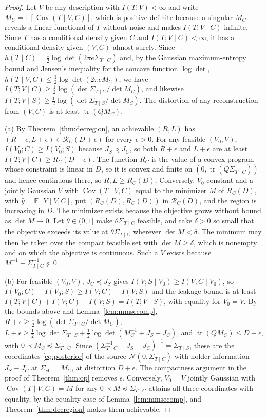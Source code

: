 \documentclass[11pt,onecolumn]{IEEEtran}
\newcommand{\E}{\mathbb{E}}
\newcommand{\tr}{\operatorname{tr}}
\newcommand{\Cov}{\operatorname{Cov}}
\newcommand{\Sez}{\Sigma_{e0}}
\newcommand{\Kc}{\Sigma_{T\mid S}}
\begin{document}
\begin{proof}
Let $V$ be any description with $I(T;V)<\infty$ and write
$M_C=\E[\Cov(T\mid V,C)]$, which is positive definite because a singular
$M_C$ reveals a linear functional of $T$ without noise and makes
$I(T;V\mid C)$ infinite. Since $T$ has a conditional density given $C$
and $I(T;V\mid C)<\infty$, it has a conditional density given $(V,C)$
almost surely. Since $h(T\mid C)=\tfrac12\log\det(2\pi e\Sigma_{T\mid C})$
and, by the Gaussian maximum-entropy bound and Jensen's inequality for
the concave function $\log\det$, $h(T\mid V,C)\le\tfrac12\log\det(2\pi eM_C)$, we have
$I(T;V\mid C)\ge\tfrac12\log(\det\Sigma_{T\mid C}/\det M_C)$, and likewise
$I(T;V\mid S)\ge\tfrac12\log(\det\Sigma_{T\mid S}/\det M_S)$. The distortion
of any reconstruction from $(V,C)$ is at least $\tr(QM_C)$.

(a) By Theorem~\ref{thm:decregion}, an achievable $(R,L)$ has
$(R+\epsilon,L+\epsilon)\in\mathcal R_C(D+\epsilon)$ for every $\epsilon>0$.
For any feasible $(V_0,V)$, $I(V_0;C)\ge I(V_0;S)$ because $J_S\preceq J_C$,
so both $R+\epsilon$ and $L+\epsilon$ are at least
$I(T;V\mid C)\ge R_C(D+\epsilon)$. The function $R_C$ is the value of a convex
program whose constraint is linear in $D$, so it is convex and finite on
$(0,\tr(Q\Sigma_{T\mid C}))$ and hence continuous there, so $R,L\ge R_C(D)$. Conversely, $V_0$ constant
and a jointly Gaussian $V$ with $\Cov(T\mid V,C)$ equal to the minimizer
$M$ of $R_C(D)$, with $\hat y=\E[Y\mid V,C]$, put $(R_C(D),R_C(D))$ in $\mathcal R_C(D)$, and
the region is increasing in $D$. The minimizer exists because the
objective grows without bound as $\det M\to0$. Let $\theta\in(0,1]$ make
$\theta\Sigma_{T\mid C}$ feasible, and take $\delta>0$ so small that the objective
exceeds its value at $\theta\Sigma_{T\mid C}$ wherever $\det M<\delta$. The
minimum may then be taken over the compact feasible set with
$\det M\ge\delta$, which is nonempty and on which the objective is continuous. Such a $V$ exists because
$M^{-1}-\Sigma_{T\mid C}^{-1}\succeq0$.

(b) For feasible $(V_0,V)$, $J_C\preceq J_S$ gives
$I(V;S\mid V_0)\ge I(V;C\mid V_0)$, so
$I(V_0;C)-I(V_0;S)\ge I(V;C)-I(V;S)$ and the leakage bound is at least
$I(T;V\mid C)+I(V;C)-I(V;S)=I(T;V\mid S)$, with equality for $V_0=V$. By the
bounds above and Lemma~\ref{lem:mmsecomp},
$R+\epsilon\ge\tfrac12\log(\det\Sigma_{T\mid C}/\det M_C)$,
$L+\epsilon\ge\tfrac12\log\det\Sigma_{T\mid S}+\tfrac12\log\det(M_C^{-1}+J_S-J_C)$,
and $\tr(QM_C)\le D+\epsilon$, with $0\prec M_C\preceq\Sigma_{T\mid C}$. Since
$(\Sigma_{T\mid C}^{-1}+J_S-J_C)^{-1}=\Kc$, these are the coordinates
\eqref{eq:posterior} of the source $\mathcal N(0,\Sigma_{T\mid C})$ with
holder information $J_S-J_C$ at $\Sez=M_C$, at distortion $D+\epsilon$. The
compactness argument in the proof of Theorem~\ref{thm:op} removes
$\epsilon$. Conversely, $V_0=V$ jointly Gaussian with $\Cov(T\mid V,C)=M$
for any $0\prec M\preceq\Sigma_{T\mid C}$ attains all three coordinates with
equality, by the equality case of Lemma~\ref{lem:mmsecomp}, and
Theorem~\ref{thm:decregion} makes them achievable.


\end{proof}
\end{document}
